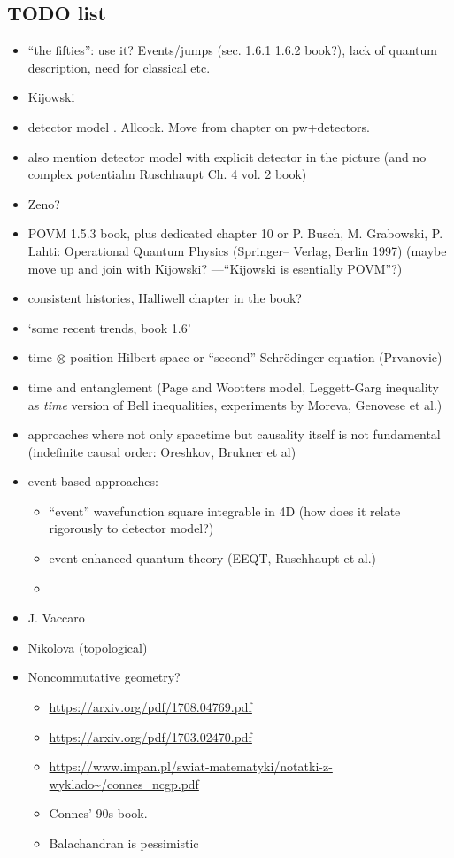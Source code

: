 \subsection*{TODO list}
\begin{itemize}
\item ``the fifties'': use it? Events/jumps (sec. 1.6.1 1.6.2 book?), lack of quantum description, need for classical etc.
\item Kijowski
\item detector model \cite{TQM1, TQM2}. Allcock. Move from chapter on pw+detectors.
\item also mention detector model with explicit detector in the picture (and no complex potentialm Ruschhaupt Ch. 4 vol. 2 book)
\item Zeno?
\item POVM 1.5.3 book, plus dedicated chapter 10 or P. Busch, M. Grabowski, P. Lahti: Operational Quantum Physics (Springer–
Verlag, Berlin 1997) (maybe move up and join with Kijowski? ---``Kijowski is esentially POVM''?)
\item consistent histories, Halliwell chapter in the book?
\item `some recent trends, book 1.6'
\item
    time $\otimes$ position Hilbert space or ``second'' Schr\"odinger equation (Prvanovic)
\item time and entanglement (Page and Wootters model, Leggett-Garg inequality as \emph{time} version of Bell inequalities, experiments by Moreva, Genovese et al.)
\item approaches where not only spacetime but causality itself is not fundamental (indefinite causal order: Oreshkov, Brukner et al)
\item event-based approaches:
  \begin{itemize}
    \item ``event'' wavefunction square integrable in 4D (how does it relate rigorously to detector model?)
    \item event-enhanced quantum theory (EEQT, Ruschhaupt et al.)
    \item
  \end{itemize}
\item J. Vaccaro
\item Nikolova (topological)
\item Noncommutative geometry?
\begin{itemize}
  \item \url{https://arxiv.org/pdf/1708.04769.pdf}
  \item \url{https://arxiv.org/pdf/1703.02470.pdf}
  \item \url{https://www.impan.pl/swiat-matematyki/notatki-z-wyklado~/connes_ncgp.pdf}
  \item Connes' 90s book.
  \item Balachandran is pessimistic
\end{itemize}
\end{itemize}
